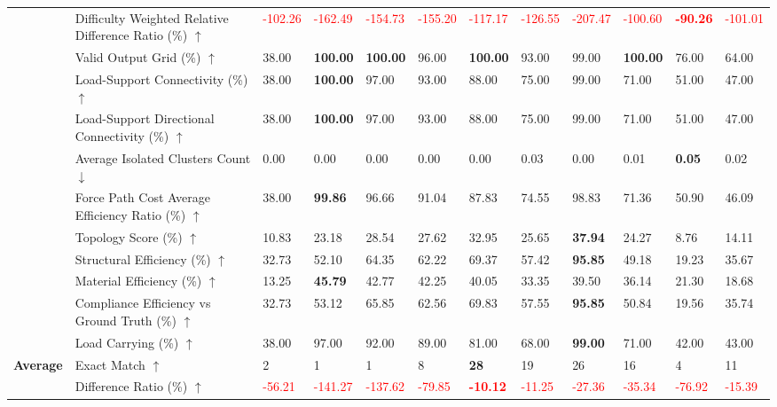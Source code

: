 \begin{table}[!h]
{\begin{tabular}{llllllllllll}
 & Difficulty Weighted Relative Difference Ratio (\%) $\uparrow$ & \textcolor{red}{-102.26} & \textcolor{red}{-162.49} & \textcolor{red}{-154.73} & \textcolor{red}{-155.20} & \textcolor{red}{-117.17} & \textcolor{red}{-126.55} & \textcolor{red}{-207.47} & \textcolor{red}{-100.60} & \textbf{\textcolor{red}{-90.26}} & \textcolor{red}{-101.01} \\
 & Valid Output Grid (\%) $\uparrow$ & 38.00 & \textbf{100.00} & \textbf{100.00} & 96.00 & \textbf{100.00} & 93.00 & 99.00 & \textbf{100.00} & 76.00 & 64.00 \\
 & Load-Support Connectivity (\%) $\uparrow$ & 38.00 & \textbf{100.00} & 97.00 & 93.00 & 88.00 & 75.00 & 99.00 & 71.00 & 51.00 & 47.00 \\
 & Load-Support Directional Connectivity (\%) $\uparrow$ & 38.00 & \textbf{100.00} & 97.00 & 93.00 & 88.00 & 75.00 & 99.00 & 71.00 & 51.00 & 47.00 \\
 & Average Isolated Clusters Count $\downarrow$ & 0.00 & 0.00 & 0.00 & 0.00 & 0.00 & 0.03 & 0.00 & 0.01 & \textbf{0.05} & 0.02 \\
 & Force Path Cost Average Efficiency Ratio (\%) $\uparrow$ & 38.00 & \textbf{99.86} & 96.66 & 91.04 & 87.83 & 74.55 & 98.83 & 71.36 & 50.90 & 46.09 \\
 & Topology Score (\%) $\uparrow$ & 10.83 & 23.18 & 28.54 & 27.62 & 32.95 & 25.65 & \textbf{37.94} & 24.27 & 8.76 & 14.11 \\
 & Structural Efficiency (\%) $\uparrow$ & 32.73 & 52.10 & 64.35 & 62.22 & 69.37 & 57.42 & \textbf{95.85} & 49.18 & 19.23 & 35.67 \\
 & Material Efficiency (\%) $\uparrow$ & 13.25 & \textbf{45.79} & 42.77 & 42.25 & 40.05 & 33.35 & 39.50 & 36.14 & 21.30 & 18.68 \\
 & Compliance Efficiency vs Ground Truth (\%) $\uparrow$ & 32.73 & 53.12 & 65.85 & 62.56 & 69.83 & 57.55 & \textbf{95.85} & 50.84 & 19.56 & 35.74 \\
 & Load Carrying (\%) $\uparrow$ & 38.00 & 97.00 & 92.00 & 89.00 & 81.00 & 68.00 & \textbf{99.00} & 71.00 & 42.00 & 43.00 \\
\midrule
\textbf{Average} & Exact Match $\uparrow$ & 2 & 1 & 1 & 8 & \textbf{28} & 19 & 26 & 16 & 4 & 11 \\
 & Difference Ratio (\%) $\uparrow$ & \textcolor{red}{-56.21} & \textcolor{red}{-141.27} & \textcolor{red}{-137.62} & \textcolor{red}{-79.85} & \textbf{\textcolor{red}{-10.12}} & \textcolor{red}{-11.25} & \textcolor{red}{-27.36} & \textcolor{red}{-35.34} & \textcolor{red}{-76.92} & \textcolor{red}{-15.39} \\

\end{tabular}}
\end{table}
